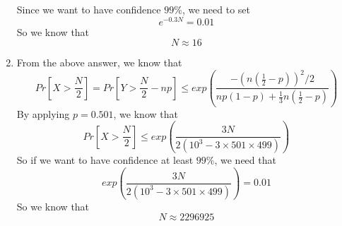 \documentclass{article}
\begin{document}
\begin{enumerate}
\begin{equation}
				\end{equation}
				Since we want to have confidence $99\%$, we need to set \begin{equation}
					e^{-0.3N} = 0.01
				\end{equation}
				So we know that \begin{equation}
					N \approx 16
				\end{equation}
			\item From the above answer, we know that \begin{equation}
					Pr\left[X > \frac{N}{2}\right] = Pr\left[Y > \frac{N}{2} - np\right] \leq exp(\frac{-(n(\frac{1}{2} - p))^2 / 2}{np(1 - p) + \frac{1}{3}n(\frac{1}{2} - p)})
				\end{equation}
				By applying $p = 0.501$, we know that \begin{equation}
					Pr\left[X > \frac{N}{2}\right] \leq exp(\frac{3N}{2(10^3-3\times 501\times 499)})
				\end{equation}
				So if we want to have confidence at least $99\%$, we need that \begin{equation}
					exp(\frac{3N}{2(10^3-3\times 501\times 499)}) = 0.01
				\end{equation}
				So we know that \begin{equation}
					N \approx 2296925
				\end{equation}
		\end{enumerate}
\end{document}
